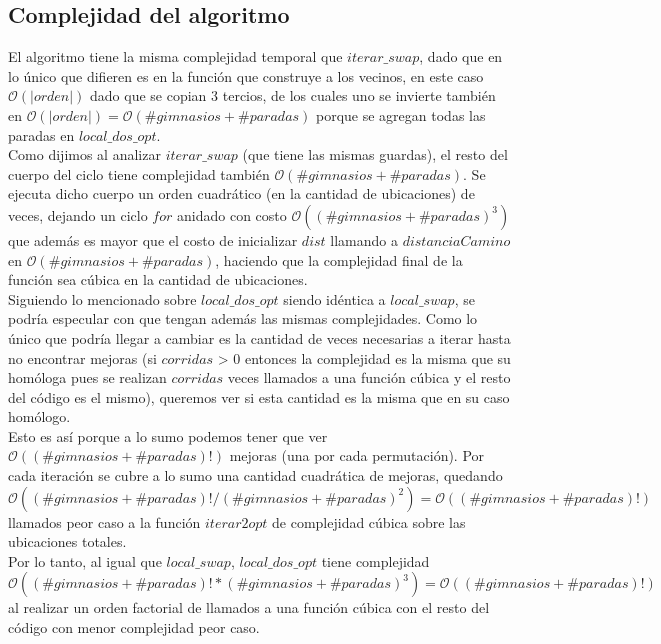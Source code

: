     \subsection{Complejidad del algoritmo}
    El algoritmo tiene la misma complejidad temporal que $iterar\_swap$, dado que en lo único que difieren es en la función que construye a los vecinos, en este caso $\mathcal{O}(|orden|)$ dado que se copian 3 tercios, de los cuales uno se invierte también en $\mathcal{O}(|orden|) = \mathcal{O}(\#gimnasios + \#paradas)$ porque se agregan todas las paradas en $local\_dos\_opt$. \\

    Como dijimos al analizar $iterar\_swap$ (que tiene las mismas guardas), el resto del cuerpo del ciclo tiene complejidad también $\mathcal{O}(\#gimnasios + \#paradas)$. Se ejecuta dicho cuerpo un orden cuadrático (en la cantidad de ubicaciones) de veces, dejando un ciclo $for$ anidado con costo $\mathcal{O}((\#gimnasios + \#paradas)^3)$ que además es mayor que el costo de inicializar $dist$ llamando a $distanciaCamino$ en $\mathcal{O}(\#gimnasios + \#paradas)$, haciendo que la complejidad final de la función sea cúbica en la cantidad de ubicaciones.
    \\

    Siguiendo lo mencionado sobre $local\_dos\_opt$ siendo idéntica a $local\_swap$, se podría especular con que tengan además las mismas complejidades. Como lo único que podría llegar a cambiar es la cantidad de veces necesarias a iterar hasta no encontrar mejoras (si $corridas$ > 0 entonces la complejidad es la misma que su homóloga pues se realizan $corridas$ veces llamados a una función cúbica y el resto del código es el mismo), queremos ver si esta cantidad es la misma que en su caso homólogo.
    \\

    Esto es así porque a lo sumo podemos tener que ver $\mathcal{O}((\#gimnasios + \#paradas)!)$ mejoras (una por cada permutación). Por cada iteración se cubre a lo sumo una cantidad cuadrática de mejoras, quedando $\mathcal{O}((\#gimnasios + \#paradas)!/(\#gimnasios + \#paradas)^2) = \mathcal{O}((\#gimnasios + \#paradas)!)$ llamados peor caso a la función $iterar2opt$ de complejidad cúbica sobre las ubicaciones totales.
    \\

    Por lo tanto, al igual que $local\_swap$, $local\_dos\_opt$ tiene complejidad $\mathcal{O}((\#gimnasios + \#paradas)!*(\#gimnasios + \#paradas)^3) = \mathcal{O}((\#gimnasios + \#paradas)!)$ al realizar un orden factorial de llamados a una función cúbica con el resto del código con menor complejidad peor caso.
